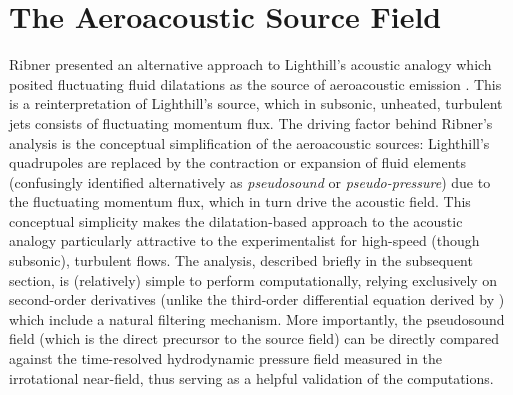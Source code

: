 \section{The Aeroacoustic Source Field}
\label{sect:source}
Ribner presented an alternative approach to Lighthill's acoustic analogy which posited fluctuating fluid dilatations as the source of aeroacoustic emission \citep{Ribner1962}.
This is a reinterpretation of Lighthill's source, which in subsonic, unheated, turbulent jets consists of fluctuating momentum flux.
The driving factor behind Ribner's analysis is the conceptual simplification of the aeroacoustic sources: Lighthill's quadrupoles are replaced by the contraction or expansion of fluid elements (confusingly identified alternatively as \emph{pseudosound} or \emph{pseudo-pressure}) due to the fluctuating momentum flux, which in turn drive the acoustic field.
This conceptual simplicity makes the dilatation-based approach to the acoustic analogy particularly attractive to the experimentalist for high-speed (though subsonic), turbulent flows.
The analysis, described briefly in the subsequent section, is (relatively) simple to perform computationally, relying exclusively on second-order derivatives (unlike the third-order differential equation derived by \citet{Lilley2003}) which include a natural filtering mechanism.
More importantly, the pseudosound field (which is the direct precursor to the source field) can be directly compared against the time-resolved hydrodynamic pressure field measured in the irrotational near-field, thus serving as a helpful validation of the computations.

